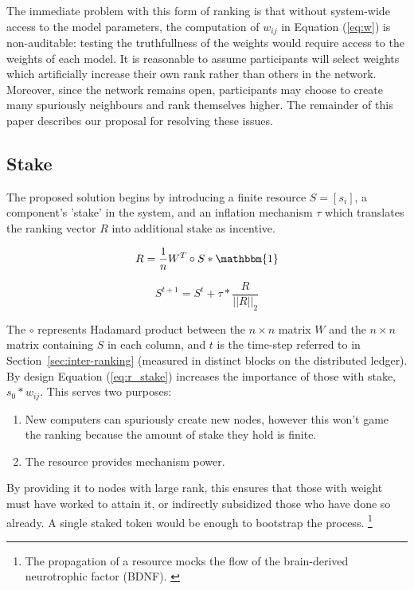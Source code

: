 \documentclass{article}
\begin{document}
The immediate problem with this form of ranking is that without system-wide access to the model parameters, the computation of $w_{ij}$ in Equation (\ref{eq:w}) is non-auditable: testing the truthfullness of the weights would require access to the weights of each model. It is reasonable to assume participants will select weights which artificially increase their own rank rather than others in the network. Moreover, since the network remains open, participants may choose to create many spuriously neighbours and rank themselves higher. The remainder of this paper describes our proposal for resolving these issues.

\subsection{Stake}
\label{sec:stake}
The proposed solution begins by introducing a finite resource $ S=[s_i]$, a component's 'stake' in the system, and an inflation mechanism $\tau$ which translates the ranking vector $R$ into additional stake as incentive. 

\begin{equation}
\label{eq:r_stake}
R = \frac{1}{n} W^T \circ S * \mathbbm{1}
\end{equation}

\begin{equation}
S^{t+1} = S^t + \tau * \frac{R}{||R||_2} 
\end{equation}

The $\circ$ represents Hadamard product between the $n \times n$ matrix $W$ and the $n \times n$ matrix containing $S$ in each column, and $t$ is the time-step referred to in Section~\ref{sec:inter-ranking} (measured in distinct blocks on the distributed ledger). By design Equation (\ref{eq:r_stake}) increases the importance of those with stake, $s_0 * w_{ij}$. This serves two purposes: 

\begin{enumerate}
	\item New computers can spuriously create new nodes, however this won't game the ranking because the amount of stake they hold is finite.
	\item The resource provides mechanism power.
\end{enumerate}

By providing it to nodes with large rank, this ensures that those with weight must have worked to attain it, or indirectly subsidized those who have done so already. A single staked token would be enough to bootstrap the process. \footnote{The propagation of a resource mocks the flow of the brain-derived neurotrophic factor (BDNF). \cite{Bathina1989neurotrophin}} 
\end{document}
